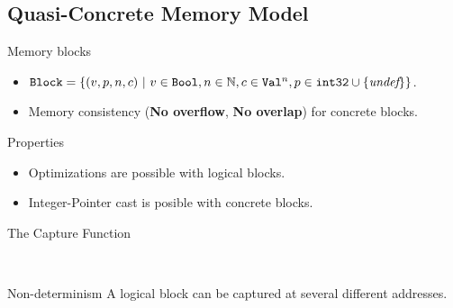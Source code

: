\subsection{Quasi-Concrete Memory Model}
\begin{frame}{\subsecname}

  \begin{block}{Memory blocks}
    \begin{itemize}
    \item $\texttt{Block}=\{(v,p,n,c)~|~v\in\texttt{Bool},n\in\mathbb{N},c\in\texttt{Val}^{n},p\in\texttt{int32}\cup\{\textit{undef}\}\}$.
    \item Memory consistency (\textbf{No overflow}, \textbf{No overlap}) for concrete blocks.
    \end{itemize}
  \end{block}
  \vfill
  \begin{exampleblock}{Properties}
    \begin{itemize}
    \item Optimizations are possible with logical blocks.
    \item Integer-Pointer cast is posible with concrete blocks.
    \end{itemize}
  \end{exampleblock}
  
\end{frame}

\begin{frame}{The Capture Function}

  \\
  \vfill
  \begin{alertblock}{Non-determinism}
    A logical block can be captured at several different addresses.
  \end{alertblock}
  
\end{frame}
